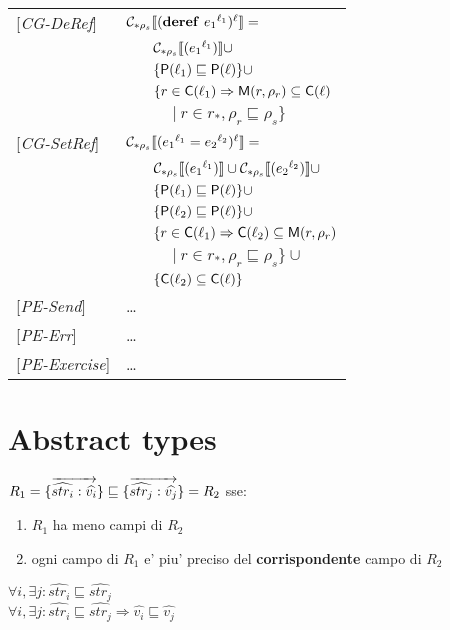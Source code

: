 \documentclass[[12pt,a4paper,twoside,openrigh]{report}
\begin{document}
\begin{tabular} {l l l l}
{[\textit{CG-DeRef}]}&\multicolumn{3}{l}{$\mathcal{C}_{*\rho_s}\llbracket (\mathbf{deref}\ {e_1}^{\ell_1})^\ell \rrbracket = $}\\
&&\multicolumn{2}{l}{$ \mathcal{C}_{*\rho_s}\llbracket ({e_1}^{\ell_1}) \rrbracket \cup$}\\
&&\multicolumn{2}{l}{$\{ \mathsf{P}(\ell_1) \sqsubseteq \mathsf{P}(\ell) \} \cup$}\\
&&\multicolumn{2}{l}{$\{r \in \mathsf{C}(\ell_1) \Rightarrow \mathsf{M}(r, \rho_r) \subseteq \mathsf{C}(\ell)$} \\
&&&$|\ r \in r_*, \rho_r \sqsubseteq \rho_s\}$\\
{[\textit{CG-SetRef}]}&\multicolumn{3}{l}{$\mathcal{C}_{*\rho_s}\llbracket ({e_1}^{\ell_1} = {e_2}^{\ell_2})^\ell \rrbracket = $}\\
&&\multicolumn{2}{l}{$ \mathcal{C}_{*\rho_s}\llbracket ({e_1}^{\ell_1}) \rrbracket \cup \mathcal{C}_{*\rho_s}\llbracket ({e_2}^{\ell_2}) \rrbracket \cup $}\\
&&\multicolumn{2}{l}{$ \{ \mathsf{P}(\ell_1) \sqsubseteq \mathsf{P}(\ell) \} \cup$}\\
&&\multicolumn{2}{l}{$ \{ \mathsf{P}(\ell_2) \sqsubseteq \mathsf{P}(\ell) \} \cup$}\\
&&\multicolumn{2}{l}{$\{r \in \mathsf{C}(\ell_1) \Rightarrow \mathsf{C}(\ell_2) \subseteq \mathsf{M}(r, \rho_r)$}\\
&&&$|\ r \in r_*, \rho_r \sqsubseteq \rho_s\}\cup$ \\
&&\multicolumn{2}{l}{$\{ \mathsf{C}(\ell_2) \subseteq \mathsf{C}(\ell) \}$} \\
{[\textit{PE-Send}]}& \dots \\
{[\textit{PE-Err}]}& \dots \\
{[\textit{PE-Exercise}]}& \dots \\
\end{tabular}

\section{Abstract types}
\label{sec:abstractTy}
$ R_1=\{\overrightarrow{\widehat{str_i}:\widehat{v_i}}\} \sqsubseteq \{\overrightarrow{\widehat{str_j}:\widehat{v_j}}\}=R_2 $ sse:
\begin{enumerate}
\item $R_1$ ha meno campi di $R_2$
\item ogni campo di $R_1$ e' piu' preciso del \textbf{corrispondente} campo di $R_2$ 
\end{enumerate}

$\forall i, \exists j: \widehat{str_i} \sqsubseteq \widehat{str_j}$\\
$\forall i, \exists j: \widehat{str_i} \sqsubseteq \widehat{str_j} \Rightarrow \widehat{v_i} \sqsubseteq \widehat{v_j}$
\end{document}

